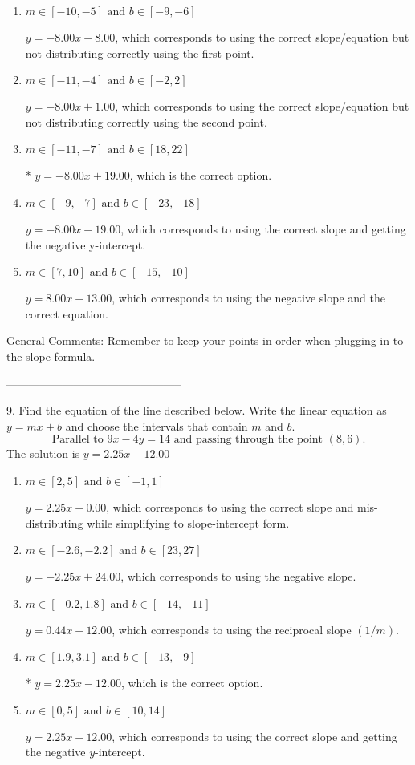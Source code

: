 \documentclass{article}[14pt]
\begin{document}
\begin{enumerate}[label=\Alph*.] 
\item $ m \in [-10, -5] \text{ and } b \in [-9, -6] $ 

  $y = -8.00x - 8.00$, which corresponds to using the correct slope/equation but not distributing correctly using the first point. 
\item $ m \in [-11, -4] \text{ and } b \in [-2, 2] $ 

  $y = -8.00x + 1.00$, which corresponds to using the correct slope/equation but not distributing correctly using the second point. 
\item $ m \in [-11, -7] \text{ and } b \in [18, 22] $ 

 * $y = -8.00x + 19.00$, which is the correct option. 
\item $ m \in [-9, -7] \text{ and } b \in [-23, -18] $ 

  $y = -8.00x - 19.00$, which corresponds to using the correct slope and getting the negative y-intercept. 
\item $ m \in [7, 10] \text{ and } b \in [-15, -10] $ 

  $y = 8.00x - 13.00$, which corresponds to using the negative slope and the correct equation. 
\end{enumerate} 
 
General Comments: Remember to keep your points in order when plugging in to the slope formula.

-----------------------------------------------

9. Find the equation of the line described below. Write the linear equation as $ y=mx+b $ and choose the intervals that contain $m$ and $b$.
$$ \text{Parallel to } 9 x - 4 y = 14 \text{ and passing through the point } (8, 6). $$ 
The solution is $ y = 2.25x - 12.00 $ 

\begin{enumerate}[label=\Alph*.] 
\item $ m \in [2, 5] \text{ and } b \in [-1, 1] $ 

  $y = 2.25x + 0.00$, which corresponds to using the correct slope and mis-distributing while simplifying to slope-intercept form. 
\item $ m \in [-2.6, -2.2] \text{ and } b \in [23, 27] $ 

  $y = -2.25x + 24.00$, which corresponds to using the negative slope. 
\item $ m \in [-0.2, 1.8] \text{ and } b \in [-14, -11] $ 

  $y = 0.44x - 12.00$, which corresponds to using the reciprocal slope $(1/m)$. 
\item $ m \in [1.9, 3.1] \text{ and } b \in [-13, -9] $ 

 * $y = 2.25x - 12.00$, which is the correct option. 
\item $ m \in [0, 5] \text{ and } b \in [10, 14] $ 

  $y = 2.25x + 12.00$, which corresponds to using the correct slope and getting the negative $y$-intercept. 
\end{enumerate} 
 
\end{document}
